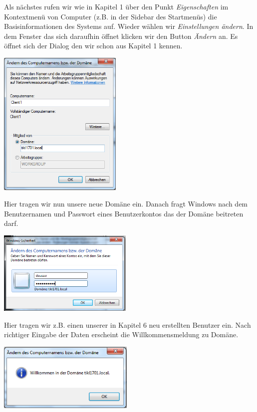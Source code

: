 \documentclass[12pt,a4paper,titlepage]{scrartcl} %
\begin{document}
Als nächstes rufen wir wie in Kapitel 1 über den Punkt \emph{Eigenschaften} im Kontextmenü von Computer (z.B. in der Sidebar des Startmenüs) die Basisinformationen des Systems auf. Wieder wählen wir \emph{Einstellungen ändern}. In dem Fenster das sich daraufhin öffnet klicken wir den Button \emph{Ändern} an. Es öffnet sich der Dialog den wir schon aus Kapitel 1 kennen.\\

	\begin{center}\includegraphics[height=7cm]{Bilder/Client/Client03}\\ \end{center}
	
Hier tragen wir nun unsere neue Domäne ein. Danach fragt Windows nach dem Benutzernamen und Passwort eines Benutzerkontos das der Domäne beitreten darf.\\

	\begin{center}\includegraphics[height=4cm]{Bilder/Client/Client04}\\ \end{center}

Hier tragen wir z.B. einen unserer in Kapitel 6 neu erstellten Benutzer ein. Nach richtiger Eingabe der Daten erscheint die Willkommensmeldung zu Domäne.\\

	\begin{center}\includegraphics[width=6.5cm]{Bilder/Client/Client05}\\ \end{center}
	
\end{document}
